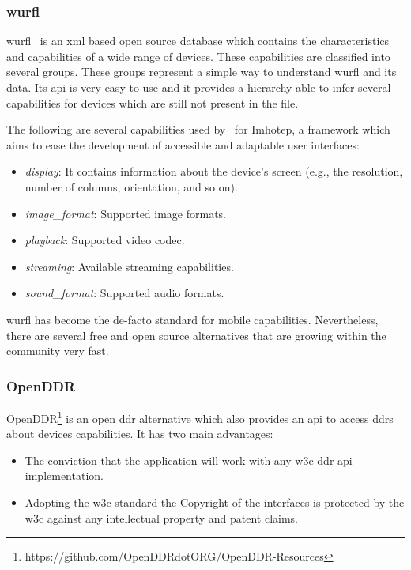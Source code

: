 \subsubsection{\ac{wurfl}} 

\ac{wurfl}~\citep{wurfl} is an \ac{xml} based
open source database which contains the characteristics and capabilities of a 
wide range of devices. These capabilities are classified into several groups. 
These groups represent a simple way to understand \ac{wurfl} and its data. Its 
\ac{api} is very easy to use and it provides a hierarchy able to infer several 
capabilities for devices which are still not present in the file.

The following are several capabilities used by~\citet{almeida_imhotep_2011} for
Imhotep, a framework which aims to ease the development of accessible and adaptable
user interfaces:

\begin{itemize}
 \item \textit{display}: It contains information about the device's screen (e.g.,
 the resolution, number of columns, orientation, and so on).
 \item \textit{image\_format}: Supported image formats.
 \item \textit{playback}: Supported video codec.
 \item \textit{streaming}: Available streaming capabilities.
 \item \textit{sound\_format}: Supported audio formats.
\end{itemize}

\ac{wurfl} has become the de-facto standard for mobile capabilities. Nevertheless,
there are several free and open source alternatives that are growing within the
community very fast.

\subsubsection{OpenDDR}

OpenDDR\footnote{https://github.com/OpenDDRdotORG/OpenDDR-Resources} is an open 
\ac{ddr} alternative which also provides an \ac{api} to access \ac{ddr}s about 
devices capabilities. It has two main advantages:

\begin{itemize}
 \item The conviction that the application will work with any \ac{w3c} \ac{ddr} 
 \ac{api} implementation.
 \item Adopting the \ac{w3c} standard the Copyright of the interfaces is 
 protected by the \ac{w3c} against any intellectual property and patent claims.
\end{itemize}

